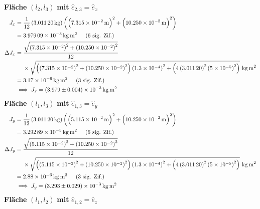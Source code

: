             \textbf{Fläche} $(l_2, l_3)$ \textbf{mit} $\hat{e}_{2,3} = \hat{e}_x$ 
            \begin{align}
                J_x &= \frac{1}{12}\left(\SI{3.01120}{\kilo\gram}\right)\left(\left(\SI{7.315e-2}{\meter}\right)^2 + \left(\SI{10.250e-2}{\meter}\right)^2\right) \notag \\
                &= \SI{3.97909e-3}{\kilo\gram\meter\squared} \sigfig{6} \\
                \Delta J_x &= \frac{\sqrt{\left(\SI{7.315e-2}{}\right)^2 + \left(\SI{10.250e-2}{}\right)^2}}{12} \notag \\
                &~~~~\times\sqrt{\left(\left(\SI{7.315e-2}{}\right)^2 + \left(\SI{10.250e-2}{}\right)^2\right)\left(\SI{1.3e-4}{}\right)^2 + \left(4\left(\SI{3.01120}{}\right)^2\left(\SI{5e-5}{}\right)^2\right)} ~\SI{}{\kilo\gram\meter\squared} \notag \\
                &= \SI{3.17e-6}{\kilo\gram\meter\squared} \sigfig{3} \\
                &\implies J_x = \SI{3.979(4)e-3}{\kilo\gram\meter\squared}
            \end{align}
            \textbf{Fläche} $(l_1, l_3)$ \textbf{mit} $\hat{e}_{1,3} = \hat{e}_y$ 
            \begin{align}
                J_y &= \frac{1}{12}\left(\SI{3.01120}{\kilo\gram}\right)\left(\left(\SI{5.115e-2}{\meter}\right)^2 + \left(\SI{10.250e-2}{\meter}\right)^2\right) \notag \\
                &= \SI{3.29289e-3}{\kilo\gram\meter\squared} \sigfig{6} \\
                \Delta J_y &= \frac{\sqrt{\left(\SI{5.115e-2}{}\right)^2 + \left(\SI{10.250e-2}{}\right)^2}}{12} \notag \\
                &~~~~\times\sqrt{\left(\left(\SI{5.115e-2}{}\right)^2 + \left(\SI{10.250e-2}{}\right)^2\right)\left(\SI{1.3e-4}{}\right)^2 + \left(4\left(\SI{3.01120}{}\right)^2\left(\SI{5e-5}{}\right)^2\right)} ~\SI{}{\kilo\gram\meter\squared} \notag \\
                &= \SI{2.88e-6}{\kilo\gram\meter\squared} \sigfig{3} \\
                &\implies J_y = \SI{3.293(29)e-3}{\kilo\gram\meter\squared}
            \end{align}
            \textbf{Fläche} $(l_1, l_2)$ \textbf{mit} $\hat{e}_{1,2} = \hat{e}_z$ 
